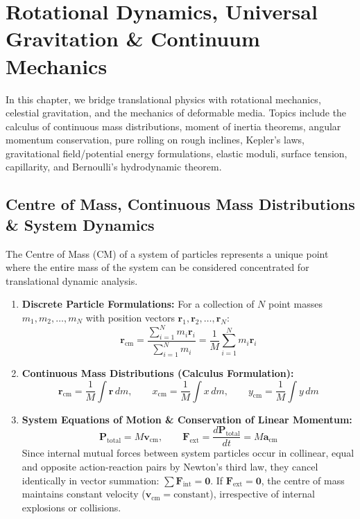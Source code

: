 \documentclass[10pt,twoside,openright]{book}
\begin{document}
\chapter{Rotational Dynamics, Universal Gravitation \& Continuum Mechanics}

In this chapter, we bridge translational physics with rotational mechanics, celestial gravitation, and the mechanics of deformable media. Topics include the calculus of continuous mass distributions, moment of inertia theorems, angular momentum conservation, pure rolling on rough inclines, Kepler's laws, gravitational field/potential energy formulations, elastic moduli, surface tension, capillarity, and Bernoulli's hydrodynamic theorem.

\section{Centre of Mass, Continuous Mass Distributions \& System Dynamics}

\begin{conceptbox}
The Centre of Mass ($\mathrm{CM}$) of a system of particles represents a unique point where the entire mass of the system can be considered concentrated for translational dynamic analysis.
\begin{enumerate}[leftmargin=*]
  \item \textbf{Discrete Particle Formulations:} For a collection of $N$ point masses $m_1, m_2, \dots, m_N$ with position vectors $\mathbf{r}_1, \mathbf{r}_2, \dots, \mathbf{r}_N$:
  \begin{equation}
    \mathbf{r}_{\text{cm}} = \frac{\sum_{i=1}^N m_i \mathbf{r}_i}{\sum_{i=1}^N m_i} = \frac{1}{M}\sum_{i=1}^N m_i \mathbf{r}_i
  \end{equation}
  \item \textbf{Continuous Mass Distributions (Calculus Formulation):}
  \begin{equation}
    \mathbf{r}_{\text{cm}} = \frac{1}{M}\int \mathbf{r}\,dm, \qquad x_{\text{cm}} = \frac{1}{M}\int x\,dm, \qquad y_{\text{cm}} = \frac{1}{M}\int y\,dm
  \end{equation}
  \item \textbf{System Equations of Motion \& Conservation of Linear Momentum:}
  \begin{equation}
    \mathbf{P}_{\text{total}} = M\mathbf{v}_{\text{cm}}, \qquad \mathbf{F}_{\text{ext}} = \frac{d\mathbf{P}_{\text{total}}}{dt} = M\mathbf{a}_{\text{cm}}
  \end{equation}
  Since internal mutual forces between system particles occur in collinear, equal and opposite action-reaction pairs by Newton's third law, they cancel identically in vector summation: $\sum \mathbf{F}_{\text{int}} = \mathbf{0}$. If $\mathbf{F}_{\text{ext}} = \mathbf{0}$, the centre of mass maintains constant velocity ($\mathbf{v}_{\text{cm}} = \text{constant}$), irrespective of internal explosions or collisions.
\end{enumerate}
\end{conceptbox}
\end{document}
